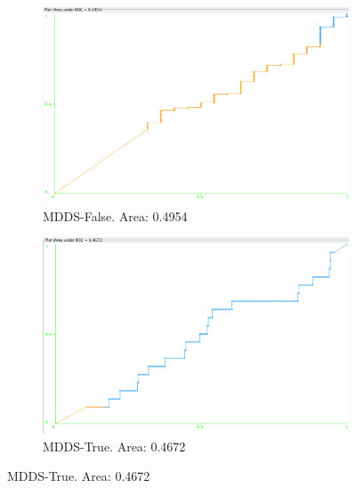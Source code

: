 \documentclass[11pt, notitlepage,abstracton,oneside]{article}   	%
\begin{document}
\begin{figure}[H]
    \begin{subfigure}[b]{0.45\textwidth}
        \centering
        \includegraphics[width=\textwidth]{figures/approach2/MDDS-False(0)}
        \caption{MDDS-False. Area: 0.4954}
        \label{fig:MDDS-False(0)}
    \end{subfigure}
    \hfill
    \begin{subfigure}[b]{0.45\textwidth}
        \centering
        \includegraphics[width=\textwidth]{figures/approach2/MDDS-True(1)}
        \caption{MDDS-True. Area: 0.4672}
        \label{fig:MDDS-True(1)}
    \end{subfigure}
    \hfill
\end{figure}
\end{document}
